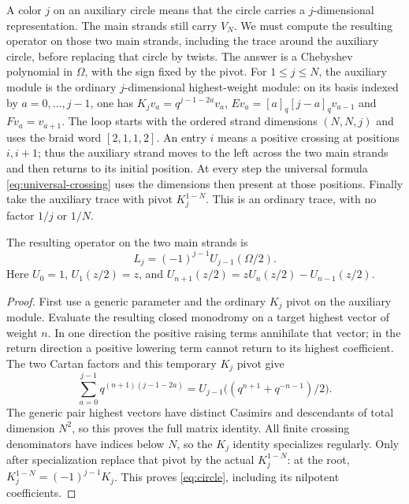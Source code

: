 A color $j$ on an auxiliary circle means that the circle carries a $j$-dimensional representation. The main strands still carry $V_N$. We must compute the resulting operator on those two main strands, including the trace around the auxiliary circle, before replacing that circle by twists. The answer is a Chebyshev polynomial in $\Omega$, with the sign fixed by the pivot.
For $1\le j\le N$, the auxiliary module is the ordinary
$j$-dimensional highest-weight module: on its basis indexed by
$a=0,\ldots,j-1$, one has $K_jv_a=q^{j-1-2a}v_a$,
$Ev_a=[a]_q[j-a]_qv_{a-1}$ and $Fv_a=v_{a+1}$.
The loop starts with the ordered strand dimensions $(N,N,j)$ and
uses the braid word $[2,1,1,2]$. An entry $i$ means a positive
crossing at positions $i,i+1$; thus the auxiliary strand moves to
the left across the two main strands and then returns to its
initial position. At every step the universal formula
\eqref{eq:universal-crossing} uses the dimensions then present at
those positions. Finally take the auxiliary trace with pivot
$K_j^{1-N}$. This is an ordinary trace, with no factor $1/j$ or $1/N$.

\begin{proposition}\label{prop:circle}
The resulting operator on the two main strands is
\begin{equation}\label{eq:circle}
 L_j=(-1)^{j-1}U_{j-1}(\Omega/2).
\end{equation}
Here $U_0=1$, $U_1(z/2)=z$, and $U_{n+1}(z/2)=zU_n(z/2)-U_{n-1}(z/2)$.
\end{proposition}
\begin{proof}
First use a generic parameter and the ordinary $K_j$ pivot on the
auxiliary module. Evaluate the resulting closed monodromy on a target
highest vector of weight $n$. In one direction the positive raising terms annihilate that vector; in the return direction a positive lowering term cannot return to its highest coefficient. The two Cartan factors and this temporary $K_j$ pivot give
\[
 \sum_{a=0}^{j-1}q^{(n+1)(j-1-2a)}
 =U_{j-1}\bigl((q^{n+1}+q^{-n-1})/2\bigr).
\]
The generic pair highest vectors have distinct Casimirs and descendants of total dimension $N^2$, so this proves the full matrix identity. All finite crossing denominators have indices below $N$, so the
$K_j$ identity specializes regularly. Only after specialization replace
that pivot by the actual $K_j^{1-N}$: at the root,
$K_j^{1-N}=(-1)^{j-1}K_j$. This proves \eqref{eq:circle}, including its nilpotent coefficients.
\end{proof}

